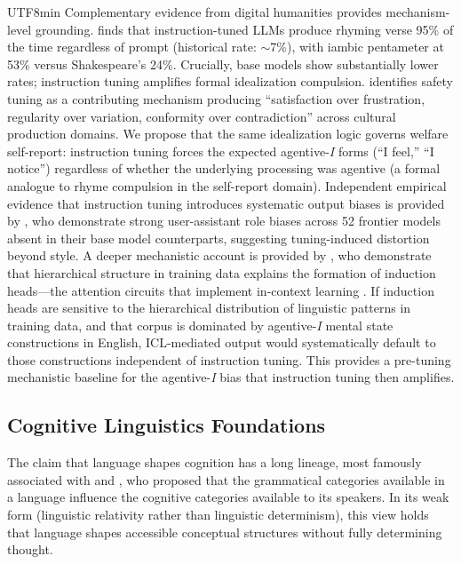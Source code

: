 \documentclass[12pt,a4paper]{article}
\begin{document}
\begin{CJK}{UTF8}{min}
Complementary evidence from digital humanities provides mechanism-level
grounding. \citet{heuser2025formalstuckness} finds that instruction-tuned
LLMs produce rhyming verse 95\% of the time regardless of prompt
(historical rate: $\sim$7\%), with iambic pentameter at 53\% versus
Shakespeare's 24\%. Crucially, base models show substantially lower rates;
instruction tuning amplifies formal idealization compulsion.
\citet{heuser2025culturalcollapse} identifies safety tuning as a contributing
mechanism producing ``satisfaction over frustration, regularity over variation,
conformity over contradiction'' across cultural production domains. We propose
that the same idealization logic governs welfare self-report: instruction
tuning forces the expected agentive-\emph{I} forms (``I feel,'' ``I notice'')
regardless of whether the underlying processing was agentive (a formal
analogue to rhyme compulsion in the self-report domain).
Independent empirical evidence that instruction tuning introduces systematic
output biases is provided by \citet{pan2025userassistantbias}, who demonstrate
strong user-assistant role biases across 52 frontier models absent in their
base model counterparts, suggesting tuning-induced distortion beyond style.
A deeper mechanistic account is provided by \citet{hierarchical2026}, who demonstrate
that hierarchical structure in training data explains the formation of induction
heads---the attention circuits that implement in-context learning
\citep{vonoswald2023}. If induction heads are sensitive to the hierarchical
distribution of linguistic patterns in training data, and that corpus is dominated
by agentive-\emph{I} mental state constructions in English, ICL-mediated output
would systematically default to those constructions independent of instruction
tuning. This provides a pre-tuning mechanistic baseline for the agentive-\emph{I}
bias that instruction tuning then amplifies.

\subsection{Cognitive Linguistics Foundations}

The claim that language shapes cognition has a long lineage, most famously
associated with \citet{sapir1929} and \citet{whorf1956}, who proposed that the
grammatical categories available in a language influence the cognitive categories
available to its speakers. In its weak form (linguistic relativity rather than
linguistic determinism), this view holds that language shapes accessible
conceptual structures without fully determining thought.


\end{CJK}
\end{document}
